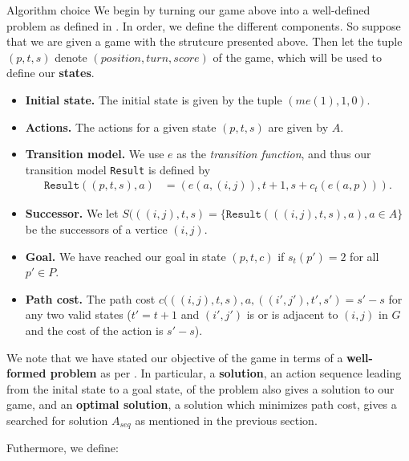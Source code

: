 \begin{section}{Algorithm choice}
  We begin by turning our game above into a well-defined problem as defined in \cite{rn}. In order, we define the different components. So suppose that we are given a game with the strutcure presented above. Then let the tuple $(p, t, s)$ denote $(position, turn, score)$ of the game, which will be used to define our \textbf{states}.

  \begin{itemize}
  \item \textbf{Initial state.} The initial state is given by the tuple $(me(1), 1, 0)$.

  \item \textbf{Actions.} The actions for a given state $(p, t, s)$ are given by $A$.

  \item \textbf{Transition model.} We use $e$ as the \textit{transition function}, and thus our transition model \texttt{Result} is defined by
    \begin{equation*}
      \begin{split}
        \texttt{Result}( (p, t, s), a ) &= ( e(a, (i,j)),
        t+1, s+c_t(e(a, p))).
      \end{split}
    \end{equation*}

    
  \item \textbf{Successor.} We let $S(((i, j), t, s) = \{\texttt{Result}(((i,j), t, s), a), a\in A \}$ be the successors of a vertice $(i, j)$.

  \item \textbf{Goal.} We have reached our goal in state $(p, t, c)$ if $s_t(p') = 2$ for all $p' \in P$.

  \item \textbf{Path cost.} The path cost $c(((i,j),t,s), a, ((i',j'),t',s') = s'-s$ for any two valid states ($t' = t+1$ and $(i', j')$ is or is adjacent to $(i, j)$ in $G$ and the cost of the action is $s'-s$). 
\end{itemize}
We note that we have stated our objective of the game in terms of a \textbf{well-formed problem} as per \cite{rn}. In particular, a \textbf{solution}, an action sequence leading from the inital state to a goal state, of the problem also gives a solution to our game, and an \textbf{optimal solution}, a solution which minimizes path cost, gives a searched for solution $A_{seq}$ as mentioned in the previous section. 

Futhermore, we define:
\begin{itemize}
  

\end{itemize}
\end{section}
